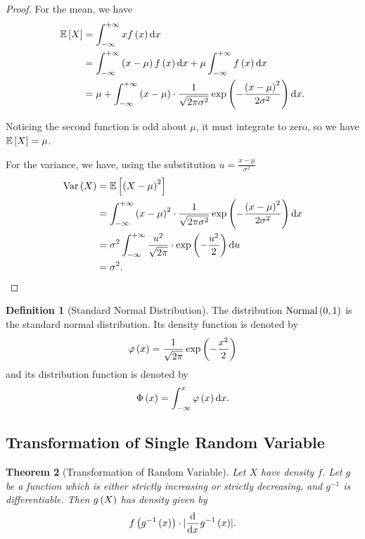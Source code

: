 \documentclass{article}
\newtheorem{theorem}{Theorem}[section]
\theoremstyle{definition}
\newtheorem{definition}[theorem]{Definition}
\theoremstyle{remark}
\DeclarePairedDelimiter{\abs}{\lvert}{\rvert}
\newcommand{\Expt}{\mathbb{E}}
\newcommand{\inverse}{^{-1}}
\newcommand{\plusinfty}{+\infty}
\newcommand{\minusinfty}{-\infty}
\newcommand{\sNormCdf}{\Phi}
\newcommand{\sNormPdf}{\varphi}
\newcommand{\Var}{\operatorname{Var}}
\newcommand{\Normal}{\operatorname{Normal}}
\begin{document}
\begin{proof}
    For the mean, we have
    \begin{align*}
        \Expt\bqty{X} &= \int_{\minusinfty}^{\plusinfty} x f\pqty{x} \dd{x} \\
        &= \int_{\minusinfty}^{\plusinfty} \pqty{x - \mu} f\pqty{x} \dd{x} + \mu \int_{\minusinfty}^{\plusinfty} f\pqty{x} \dd{x} \\
        &= \mu + \int_{\minusinfty}^{\plusinfty} \pqty{x - \mu} \cdot \frac{1}{\sqrt{2 \pi \sigma^2}} \exp\pqty{-\frac{\pqty{x - \mu}^2}{2 \sigma^2}} \dd{x}.
    \end{align*}

    Noticing the second function is odd about \(\mu\), it must integrate to zero, so we have \(\Expt\bqty{X} = \mu\).

    For the variance, we have, using the substitution \(u = \frac{x - \mu}{\sigma^2}\)
    \begin{align*}
        \Var\pqty{X} &= \Expt\bqty{\pqty{X - \mu}^2} \\
        &=  \int_{\minusinfty}^{\plusinfty} \pqty{x - \mu}^2 \cdot \frac{1}{\sqrt{2 \pi \sigma^2}} \exp\pqty{-\frac{\pqty{x - \mu}^2}{2 \sigma^2}} \dd{x} \\
        &= \sigma^2 \int_{\minusinfty}^{\plusinfty} \frac{u^2}{\sqrt{2\pi}} \cdot \exp\pqty{-\frac{u^2}{2}} \dd{u} \\
        &= \sigma^2.
    \end{align*}
\end{proof}

\begin{definition}[Standard Normal Distribution]
    \label{def:standard-normal}%
    The distribution \(\Normal\pqty{0, 1}\) is the standard normal distribution. Its density function is denoted by
    \[
        \sNormPdf\pqty{x} = \frac{1}{\sqrt{2\pi}} \exp\pqty{- \frac{x^2}{2}}
    \]
    and its distribution function is denoted by
    \[
        \sNormCdf\pqty{x} = \int_{\minusinfty}^{x} \sNormPdf\pqty{x} \dd{x}.
    \]  
\end{definition}

\subsection{Transformation of Single Random Variable}

\begin{theorem}[Transformation of Random Variable]
    \label{thm:transformation-of-random-variable}
    Let \(X\) have density \(f\). Let \(g\) be a function which is either strictly increasing or strictly decreasing, and \(g\inverse\) is differentiable. Then \(g\left(X\right)\) has density given by
    \[
        f\pqty{g\inverse\pqty{x}} \cdot \abs{\dv{x} g\inverse\pqty{x}}.
    \]
\end{theorem}
\end{document}
